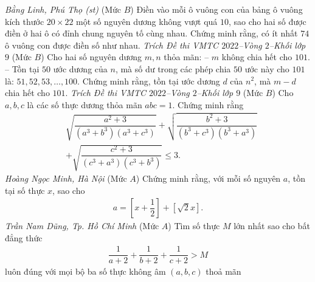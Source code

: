 \begin{multicols}{2}
\begin{center}
	\end{center}
	\vskip 0.05cm
		\hfill\textit{\small Bằng Linh, Phú Thọ (st)}
	\vskip 0.05cm
	{}
	(Mức $B$) Điền vào mỗi ô vuông con của bảng ô vuông kích thước $20\times 22$ một số nguyên dương không vượt quá $10$, sao cho hai số được điền ở hai ô có đỉnh chung nguyên tố cùng nhau. Chứng minh rằng, có ít nhất $74$ ô vuông con được điền số như nhau.
	\vskip 0.15cm
		\hfill\textit{\small Trích Đề thi VMTC $2022$--Vòng $2$--Khối lớp $9$}
	\vskip 0.15cm
	{}
	(Mức $B$) Cho hai số nguyên dương $m, n$ thỏa mãn:
	\vskip 0.05cm
	-- $m$ không chia hết cho $101$.
	\vskip 0.05cm
	-- Tồn tại $50$ ước dương của $n$, mà số dư trong các phép chia $50$ ước này cho $101$ là: $51, 52, 53, \ldots, 100.$ 
	\vskip 0.05cm
	Chứng minh rằng, tồn tại ước dương $d$ của $n^2$, mà $m-d$ chia hết cho $101$.
	\vskip 0.15cm
		\hfill\textit{\small Trích Đề thi VMTC $2022$--Vòng $2$--Khối lớp $9$}
	\vskip 0.15cm
	{}
	(Mức $B$) Cho $a, b, c$ là các số thực dương thỏa mãn $a b c=1$. Chứng minh rằng
	\begin{align*}
		&\sqrt{\dfrac{a^2\!+\!3}{\left(a^3\!+\!b^3\right)\!\left(a^3\!+\!c^3\right)}}\!+\!\sqrt{\dfrac{b^2\!+\!3}{\left(b^3\!+\!c^3\right)\!\left(b^3\!+\!a^3\right)}}\\
		&+\sqrt{\dfrac{c^2\!+\!3}{\left(c^3\!+\!a^3\right)\!\left(c^3\!+\!b^3\right)}} \leq 3.
	\end{align*}
	\vskip 0.05cm
		\hfill\textit{\small Hoàng Ngọc Minh, Hà Nội}
	\vskip 0.05cm
	{}
	(Mức $A$) Chứng minh rằng, với mỗi số nguyên $a$, tồn tại số thực $x$, sao cho  
	\begin{align*}
		a=\left[x+\dfrac12\right]+\left[\sqrt{2}x\right].
	\end{align*}
	\vskip 0.15cm
		\hfill\textit{\small Trần Nam Dũng, Tp. Hồ Chí Minh}
	\vskip 0.15cm
	{}
	(Mức $A$) Tìm số thực $M$ lớn nhất sao cho bất đẳng thức 
	\begin{align*}
		\dfrac{1}{{a + 2}} + \dfrac{1}{{b + 2}} + \dfrac{1}{{c + 2}} > M
	\end{align*}
	luôn đúng với mọi bộ ba số thực không âm $(a,b,c)$ thoả mãn  
	\vskip 0.05cm

\end{multicols}
